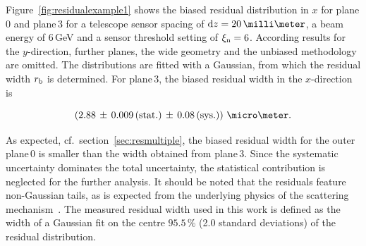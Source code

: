 Figure~\ref{fig:residualexample1} shows the biased residual distribution in $x$ for plane\,0 and plane\,3 for a telescope sensor spacing of $\dz = 20\,\milli\meter$,
 a beam energy of 6\,GeV and a sensor threshold setting of $\xi_{\textrm{n}} = 6$. 
According results for the $y$-direction, further planes, the wide geometry and the unbiased methodology are omitted. 
The distributions are fitted with a Gaussian, from which the residual width $r_{\textrm{b}}$ is determined. 
For plane\,3, the biased residual width in the $x$-direction is 

\begin{equation}
\left( 2.88\,\pm\, 0.009\,\textrm{(stat.)}\,\pm\, 0.08\, \textrm{(sys.)}\right)\,\micro\meter.
\end{equation}

\noindent
As expected, cf.\ section~\ref{sec:resmultiple}, the biased residual width for the outer plane\,0 is smaller than the width obtained from plane\,3.
Since the systematic uncertainty dominates the total uncertainty, the statistical contribution is neglected for the further analysis. 
It should be noted that the residuals feature non-Gaussian tails, as is expected from the underlying physics of the scattering mechanism~\cite{ref:PDG-2014}. 
The measured residual width used in this work is defined as the width of a Gaussian fit on the centre $95.5\,\%$ (2.0 standard deviations) of the residual distribution.

% 

